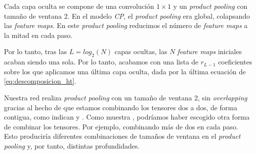 Cada capa oculta se compone de una convolución $1 \times 1$ y un \textit{product pooling} con tamaño de ventana 2. En el modelo \textit{CP}, el \textit{product pooling} era global, colapsando las \textit{feature maps}. En este \textit{product pooling} reducimos el número de \textit{feature maps} a la mitad en cada paso.

Por lo tanto, tras las $L = log_2(N)$ capas ocultas, las $N$ \textit{feature maps} iniciales acaban siendo una sola. Por lo tanto, acabamos con una lista de $r_{L - 1}$ coeficientes sobre los que aplicamos una última capa oculta, dada por la última ecuación de \eqref{eq:descomposicion_ht}.

Nuestra red realiza \textit{product pooling} con un tamaño de ventana 2, sin \textit{overlapping} gracias al hecho de que estamos combinando los tensores dos a dos, de forma contigua, como indican  y . Como muestra \cite{matematicas:descomposicion_ht}, podríamos haber escogido otra forma de combinar los tensores. Por ejemplo, combinando más de dos en cada paso. Esto produciría diferentes combinaciones de tamaños de ventana en el \textit{product pooling} y, por tanto, distintas profundidades.







